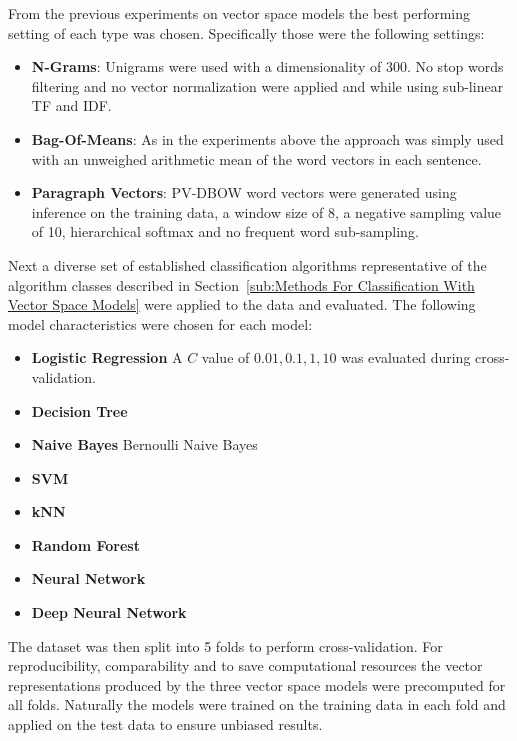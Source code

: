 From the previous experiments on vector space models the best performing setting of each type was chosen. Specifically those were the following settings:

\begin{itemize}
  \item \textbf{N-Grams}: Unigrams were used with a dimensionality of 300. No stop words filtering and no vector normalization were applied and while using sub-linear TF and IDF.
  \item \textbf{Bag-Of-Means}: As in the experiments above the approach was simply used with an unweighed arithmetic mean of the word vectors in each sentence.
  \item \textbf{Paragraph Vectors}: PV-DBOW word vectors were generated using inference on the training data, a window size of 8, a negative sampling value of 10, hierarchical softmax and no frequent word sub-sampling.
\end{itemize}

Next a diverse set of established classification algorithms representative of the algorithm classes described in Section~\ref{sub:Methods For Classification With Vector Space Models} were applied to the data and evaluated. The following model characteristics were chosen for each model:

\begin{itemize}
  \item \textbf{Logistic Regression} A $C$ value of ${0.01, 0.1, 1, 10}$ was evaluated during cross-validation.
  \item \textbf{Decision Tree}
  \item \textbf{Naive Bayes} Bernoulli Naive Bayes%
  \item \textbf{SVM}
  \item \textbf{kNN}
  \item \textbf{Random Forest}
  \item \textbf{Neural Network}
  \item \textbf{Deep Neural Network}
\end{itemize}

The dataset was then split into 5 folds to perform cross-validation. For reproducibility, comparability and to save computational resources the vector representations produced by the three vector space models were precomputed for all folds. Naturally the models were trained on the training data in each fold and applied on the test data to ensure unbiased results.


